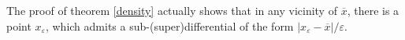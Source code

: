 	\begin{remark}
		\label{special_differentials}
		The proof of theorem \ref{density} actually shows that in any vicinity of $ \overline{x} $, there is a point $ x_{\varepsilon} $, which admits a sub-(super)differential of the form $ \lvert x_{\varepsilon} - \overline{x} \rvert / \varepsilon $.
	\end{remark}
	
		
